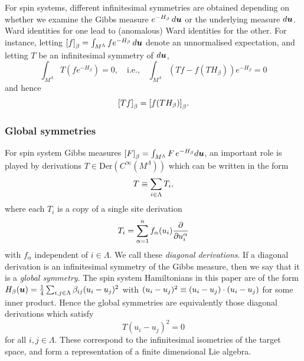 \documentclass[11pt,a4paper]{article}
\begin{document}
For spin systems, different infinitesimal symmetries are obtained
depending on whether we examine the Gibbs measure $e^{-H_\beta}\, d\boldsymbol{u}$ or 
the underlying 
measure $d\boldsymbol{u}$. Ward identities for one lead to (anomalous) Ward identities
for the other. For instance, letting $\uspin{f}_\beta =
\int_{M^{\Lambda}}f e^{-H_\beta} \, d\V{u}$ denote an unnormalised
expectation, and letting $T$ be an infinitesimal symmetry of $d\boldsymbol{u}$,
\begin{equation}
\int_{M^{\Lambda}} T(fe^{-H_\beta}) = 0, \quad \text{i.e.,} \quad
\int_{M^{\Lambda}} (Tf - f(TH_\beta))e^{-H_\beta} = 0
\end{equation}
and hence
\begin{equation}
\uspin{Tf}_\beta = \uspin{f(TH_\beta)}_\beta.
\end{equation}

\subsubsection{Global symmetries}

For spin system Gibbs measures
$\uspin{{F}}_\beta = \int_{M^{\Lambda}}{F} \, e^{-H_\beta}d\V{u}$, an
important role is played by derivations
$T \in \mathrm{Der}(C^{\infty}(M^\Lambda))$ which can be written in
the form
\begin{equation}
T \equiv \sum_{i \in \Lambda} T_i,
\end{equation}
where each $T_{i}$ is a copy of a single site derivation
\begin{equation}
T_i = \sum_{\alpha = 1}^{n}f_\alpha(u_i)\frac{\partial }{\partial u_i^\alpha}
\end{equation}
with $f_\alpha$ independent of $i\in\Lambda$.
We call these \emph{diagonal derivations}.
If a diagonal derivation is an  infinitesimal symmetry of the
Gibbs measure, then we say that it is a \emph{global symmetry}. The
spin system Hamiltonians in this paper are of the form
$H_\beta(\boldsymbol{u}) = \frac{1}{4}\sum_{i,j\in\Lambda}\beta_{ij} (u_i-u_j)^2$ with
$(u_{i}-u_{j})^{2}\equiv (u_{i}-u_{j})\cdot (u_{i}-u_{j})$ for some inner product. Hence
the global symmetries are equivalently
those diagonal derivations which satisfy
\begin{equation}
T(u_i-u_j)^2 = 0
\end{equation}
for all $i,j \in \Lambda$. These correspond to the infinitesimal
isometries of the target space, and form a representation of a finite
dimensional Lie algebra.
\end{document}
